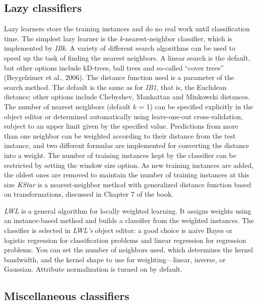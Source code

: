 \subsection{Lazy classifiers}

Lazy learners store the training instances and do no real work until
classification time. The simplest lazy learner is the
\textit{k}-nearest-neighbor classifier, which is implemented by
\textit{IBk}. A variety of different search algorithms can be used to
speed up the task of finding the nearest neighbors. A linear search is
the default, but other options include kD-trees, ball trees and
so-called ``cover trees'' (Beygelzimer et al., 2006). The distance
function used is a parameter of the search method. The default is the
same as for \textit{IB1}, that is, the Euclidean distance; other
options include Chebyshev, Manhattan and Minkowski distances. The
number of nearest neighbors (default $k$ = 1) can be specified
explicitly in the object editor or determined automatically using
leave-one-out cross-validation, subject to an upper limit given by the
specified value. Predictions from more than one neighbor can be
weighted according to their distance from the test instance, and two
different formulas are implemented for converting the distance into a
weight. The number of training instances kept by the classifier can be
restricted by setting the window size option. As new training
instances are added, the oldest ones are removed to maintain the
number of training instances at this size \textit{KStar} is a
nearest-neighbor method with generalized distance function based on
transformations, discussed in Chapter 7 of the book.

\textit{LWL} is a general algorithm for locally weighted learning. It
assigns weights using an instance-based method and builds a classifier
from the weighted instances. The classifier is selected in
\textit{LWL's} object editor: a good choice is naive Bayes or logistic
regression for classification problems and linear regression for
regression problems. You can set the number of neighbors used, which
determines the kernel bandwidth, and the kernel shape to use for
weighting---linear, inverse, or Gaussian. Attribute normalization is
turned on by default.

\subsection{Miscellaneous classifiers}

